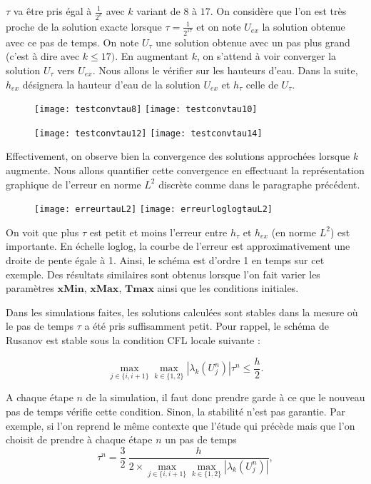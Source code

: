 \documentclass[
11pt, %
francais, %
singlespacing, %
headsepline, %
]{MastersDoctoralThesis} %
\theoremstyle{definition}
\begin{document}
$\tau$ va être pris égal à $\frac{1}{2^{k}}$ avec $k$ variant de $8$ à $17$. On considère que l'on est très proche de la solution exacte lorsque $\tau = \frac{1}{2^{17}}$ et on note $U_{ex}$ la solution obtenue avec ce pas de temps.
On note $U_{\tau}$ une solution obtenue avec un pas plus grand (c'est à dire avec $k\leq17)$. En augmentant $k$, on s'attend à voir converger la solution $U_{\tau}$ vers $U_{ex}$. Nous allons le vérifier sur les hauteurs d'eau. Dans la suite, $h_{ex}$ désignera la hauteur d'eau de la solution $U_{ex}$ et $h_{\tau}$ celle de $U_{\tau}$.

\begin{figure}
\texttt{[image: testconvtau8]}
\texttt{[image: testconvtau10]} 
\end{figure}

\begin{figure}
\texttt{[image: testconvtau12]}
\texttt{[image: testconvtau14]} 
\end{figure}

Effectivement, on observe bien la convergence des solutions approchées lorsque $k$ augmente. Nous allons quantifier cette convergence en effectuant la représentation graphique de l'erreur en norme $L^{2}$ discrète comme dans le paragraphe précédent.

\begin{figure}
\texttt{[image: erreurtauL2]}
\texttt{[image: erreurloglogtauL2]} 
\end{figure}

On voit que plus $\tau$ est petit et moins l'erreur entre $h_{\tau}$ et $h_{ex}$ (en norme $L^{2}$) est importante. En échelle loglog, la courbe de l'erreur est approximativement une droite de pente égale à 1. Ainsi, le schéma est d'ordre 1 en temps sur cet exemple. Des résultats similaires sont obtenus lorsque l'on fait varier les paramètres $\textbf{xMin}$, $\textbf{xMax}$, $\textbf{Tmax}$ ainsi que les conditions initiales. 

Dans les simulations faites, les solutions calculées sont stables dans la mesure où le pas de temps $\tau$ a été pris suffisamment petit. Pour rappel, le schéma de Rusanov est stable sous la condition CFL locale suivante :

$$
\underset{j\in \{i,i+1\}}{\max} \underset{k\in\{1,2\}}{\max} |\lambda_{k}(U_{j}^{n}) | \tau^{n} \leq \frac{h}{2}.
$$

A chaque étape $n$ de la simulation, il faut donc prendre garde à ce que le nouveau pas de temps vérifie cette condition. Sinon, la stabilité n'est pas garantie. Par exemple, si l'on reprend le même contexte que l'étude qui précède mais que l'on choisit de prendre à chaque étape $n$ un pas de temps $$\tau^{n}=\frac{3}{2}~\frac{h}{2\times\underset{j\in \{i,i+1\}}{\max} \underset{k\in\{1,2\}}{\max} |\lambda_{k}(U_{j}^{n}) |},$$
\end{document}
